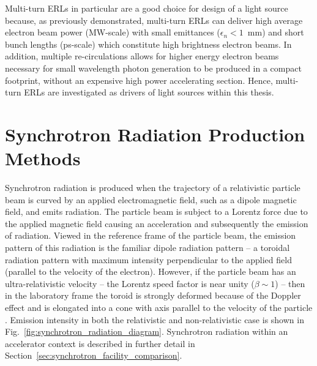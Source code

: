 \documentclass[../main.tex]{subfiles}
\begin{document}
Multi-turn ERLs in particular are a good choice for design of a light source because, as previously demonstrated, multi-turn ERLs can deliver high average electron beam power (\si{\mega\watt}-scale) with small emittances ($\epsilon_{n} < 1$~\si{\milli\meter}) and short bunch lengths (\si{\pico\second}-scale) which constitute high brightness electron beams. In addition, multiple re-circulations allows for higher energy electron beams necessary for small wavelength photon generation to be produced in a compact footprint, without an expensive high power accelerating section. Hence, multi-turn ERLs are investigated as drivers of light sources within this thesis.    

\section{Synchrotron Radiation Production Methods}
\label{sec:synchrotron_radiation_intro}

Synchrotron radiation is produced when the trajectory of a relativistic particle beam is curved by an applied electromagnetic field, such as a dipole magnetic field, and emits radiation. The particle beam is subject to a Lorentz force due to the applied magnetic field causing an acceleration and subsequently the emission of radiation. Viewed in the reference frame of the particle beam, the emission pattern of this radiation is the familiar dipole radiation pattern -- a toroidal radiation pattern with maximum intensity perpendicular to the applied field (parallel to the velocity of the electron). However, if the particle beam has an ultra-relativistic velocity -- the Lorentz speed factor is near unity ($\beta\sim1$) -- then in the laboratory frame the toroid is strongly deformed because of the Doppler effect and is elongated into a cone with axis parallel to the velocity of the particle \cite{ternov1995synchrotron}. Emission intensity in both the relativistic and non-relativistic case is shown in Fig.~\ref{fig:synchrotron_radiation_diagram}. Synchrotron radiation within an accelerator context is described in further detail in Section~\ref{sec:synchrotron_facility_comparison}.
\end{document}
